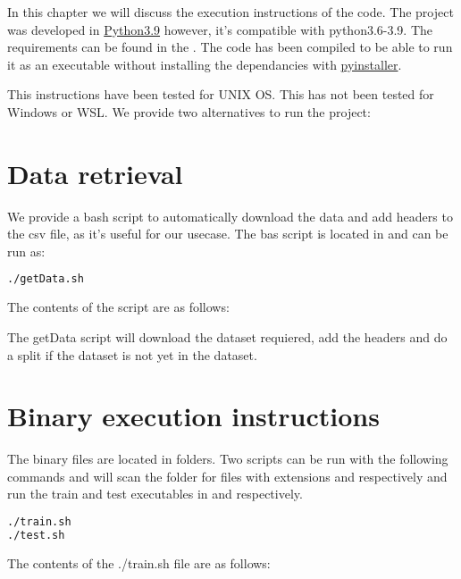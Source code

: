 In this chapter we will discuss the execution instructions of the code. The project was developed in \href{https://docs.python.org/3/whatsnew/3.9.html}{Python3.9} however, it's compatible with python3.6-3.9. The requirements can be found in the . The code has been compiled to be able to run it as an executable without installing the dependancies with \href{https://www.pyinstaller.org/}{pyinstaller}.

This instructions have been tested for UNIX OS. This has not been tested for Windows or WSL. We provide two alternatives to run the project: 

\section{Data retrieval}

We provide a bash script to automatically download the data and add headers to the csv file, as it's useful for our usecase. The bas script is located in  and can be run as: 

\begin{lstlisting}[language=bash]
./getData.sh
\end{lstlisting}

The contents of the script are as follows:



The getData script will download the dataset requiered, add the headers and do a split if the dataset is not yet in the dataset.

\section{Binary execution instructions}

The binary files are located in  folders. Two scripts can be run with the following commands and will scan the  folder for files with extensions  and  respectively and run the train and test executables in  and  respectively.

\begin{lstlisting}[language=bash]
./train.sh
./test.sh
\end{lstlisting}

The contents of the ./train.sh file are as follows:




